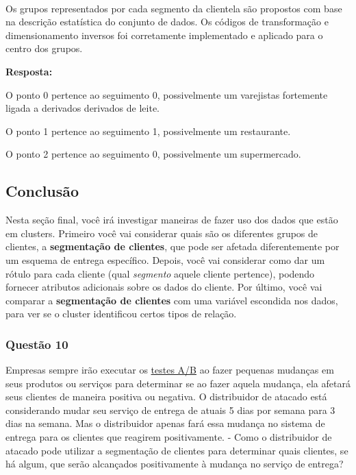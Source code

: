 \documentclass[11pt]{article}
\begin{document}
    \begin{center}
    \end{center}
    { \hspace*{\fill} \\}
    
     Os grupos representados por cada segmento da clientela são propostos
com base na descrição estatística do conjunto de dados. Os códigos de
transformação e dimensionamento inversos foi corretamente implementado e
aplicado para o centro dos grupos. 

    \textbf{Resposta:}

O ponto 0 pertence ao seguimento 0, possivelmente um varejistas
fortemente ligada a derivados derivados de leite.

O ponto 1 pertence ao seguimento 1, possivelmente um restaurante.

O ponto 2 pertence ao seguimento 0, possivelmente um supermercado.

    \subsection{Conclusão}\label{conclusuxe3o}

    Nesta seção final, você irá investigar maneiras de fazer uso dos dados
que estão em clusters. Primeiro você vai considerar quais são os
diferentes grupos de clientes, a \textbf{segmentação de clientes}, que
pode ser afetada diferentemente por um esquema de entrega específico.
Depois, você vai considerar como dar um rótulo para cada cliente (qual
\emph{segmento} aquele cliente pertence), podendo fornecer atributos
adicionais sobre os dados do cliente. Por último, você vai comparar a
\textbf{segmentação de clientes} com uma variável escondida nos dados,
para ver se o cluster identificou certos tipos de relação.

    \subsubsection{Questão 10}\label{questuxe3o-10}

Empresas sempre irão executar os
\href{https://en.wikipedia.org/wiki/A/B_testing}{testes A/B} ao fazer
pequenas mudanças em seus produtos ou serviços para determinar se ao
fazer aquela mudança, ela afetará seus clientes de maneira positiva ou
negativa. O distribuidor de atacado está considerando mudar seu serviço
de entrega de atuais 5 dias por semana para 3 dias na semana. Mas o
distribuidor apenas fará essa mudança no sistema de entrega para os
clientes que reagirem positivamente. - Como o distribuidor de atacado
pode utilizar a segmentação de clientes para determinar quais clientes,
se há algum, que serão alcançados positivamente à mudança no serviço de
entrega?
\end{document}
